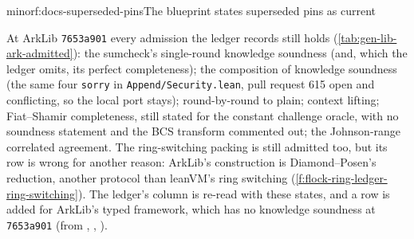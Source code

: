 \begin{finding}{minor}{f:docs-superseded-pins}{The blueprint states superseded pins as current}
\begin{sloppypar}
At ArkLib \texttt{7653a901} every admission the ledger records still holds (\cref{tab:gen-lib-ark-admitted}): the sumcheck's single-round knowledge soundness (and, which the ledger omits, its perfect completeness); the composition of knowledge soundness (the same four \texttt{sorry} in \texttt{Append/\allowbreak{}Security.\allowbreak{}lean}, pull request 615 open and conflicting, so the local port stays); round-by-round to plain; context lifting; Fiat–Shamir completeness, still stated for the constant challenge oracle, with no soundness statement and the BCS transform commented out; the Johnson-range correlated agreement. The ring-switching packing is still admitted too, but its row is wrong for another reason: ArkLib's construction is Diamond–Posen's reduction, another protocol than leanVM's ring switching (\cref{f:flock-ring-ledger-ring-switching}). The ledger's column is re-read with these states, and a row is added for ArkLib's typed framework, which has no knowledge soundness at \texttt{7653a901} (from , , ).
\end{sloppypar}
\end{finding}

